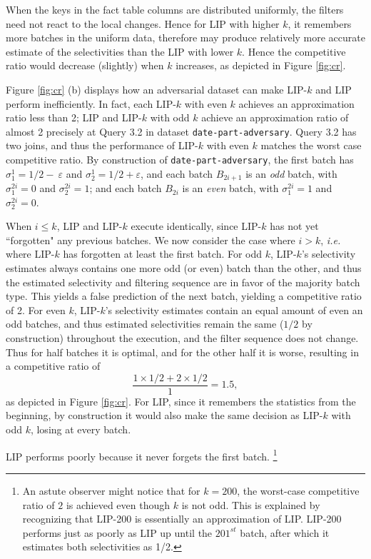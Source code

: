 When the keys in the fact table columns are distributed uniformly, the filters need not react to the local changes. Hence for LIP with higher $k$, it remembers more batches in the uniform data, therefore may produce relatively more accurate estimate of the selectivities than the LIP with lower $k$. Hence the competitive ratio would decrease (slightly) when $k$ increases, as depicted in Figure \ref{fig:cr}.  

Figure \ref{fig:cr} (b) displays how an adversarial dataset can make LIP-$k$ and LIP perform inefficiently. In fact, each LIP-$k$ with even $k$ achieves an approximation ratio less than 2; LIP and LIP-$k$ with odd $k$ achieve an approximation ratio of almost 2 precisely at Query 3.2 in dataset \texttt{date-part-adversary}. Query 3.2 has two joins, and thus the performance of LIP-$k$ with even $k$ matches the worst case competitive ratio. By construction of \texttt{date-part-adversary}, the first batch has $\sigma^{1}_{1} = 1/2-\
\varepsilon$ and $\sigma^{1}_{2} = 1/2+\varepsilon$, and  each batch $B_{2i+1}$ is an \textit{odd} batch, with $\sigma^{2i}_{1} = 0$ and $\sigma^{2i}_{2} = 1$; and each batch $B_{2i}$ is an \textit{even} batch, with $\sigma^{2i}_{1} = 1$ and $\sigma^{2i}_{2} = 0$. 

When $i \leq k$, LIP and LIP-$k$ execute identically, since LIP-$k$ has not yet ``forgotten" any previous batches. We now consider the case where $i > k$, {\it i.e.} where LIP-$k$ has forgotten at least the first batch. For odd $k$, LIP-$k$'s selectivity estimates always contains one more odd (or even) batch than the other, and thus the estimated selectivity and filtering sequence are in favor of the majority batch type. This yields a false prediction of the next batch, yielding a competitive ratio of 2. For even $k$, LIP-$k$'s selectivity estimates contain an equal amount of even an odd batches,  and thus estimated selectivities remain the same ($1/2$ by construction) throughout the execution, and the filter sequence does not change. Thus for half batches it is optimal, and for the other half it is worse, resulting in a competitive ratio of \[ \frac{1 \times 1/2 + 2 \times 1/2}{1} = 1.5,\] as depicted in Figure \ref{fig:cr}. For LIP, since it remembers the statistics from the beginning, by construction it would also make the same decision as LIP-$k$ with odd $k$, losing at every batch. 

LIP performs poorly because it never forgets the first batch.
\footnote{An astute observer might notice that for $k = 200$, the worst-case competitive ratio of $2$ is achieved even though $k$ is not odd. This is explained by recognizing that LIP-200 is essentially an approximation of LIP. LIP-200 performs just as poorly as LIP up until  the $201^{st}$ batch, after which it estimates both selectivities as 1/2.}



